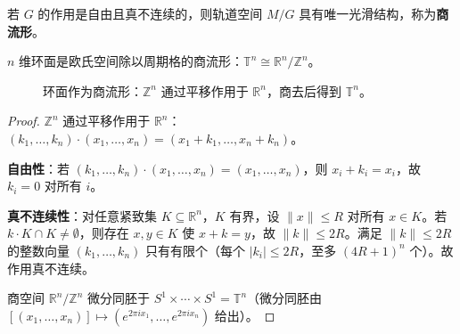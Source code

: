 \begin{definition}[轨道与商流形]\label{def:quotient_manifold}
若 $G$ 的作用是自由且真不连续的，则轨道空间 $M/G$ 具有唯一光滑结构，称为\textbf{商流形}。
\end{definition}

\begin{proposition}[环面作为商流形]\label{prop:torus_quotient}
$n$ 维环面是欧氏空间除以周期格的商流形：$\mathbb{T}^n \cong \mathbb{R}^n / \mathbb{Z}^n$。
\end{proposition}

\begin{figure}[htbp]
\centering
{}
\caption{环面作为商流形：$\mathbb{Z}^n$ 通过平移作用于 $\mathbb{R}^n$，商去后得到 $\mathbb{T}^n$。}
\label{fig:torus_quotient}
\end{figure}

\begin{proof}
$\mathbb{Z}^n$ 通过平移作用于 $\mathbb{R}^n$：$(k_1, \dots, k_n) \cdot (x_1, \dots, x_n) = (x_1 + k_1, \dots, x_n + k_n)$。

\textbf{自由性}：若 $(k_1,\dots,k_n)\cdot(x_1,\dots,x_n) = (x_1,\dots,x_n)$，则 $x_i + k_i = x_i$，故 $k_i = 0$ 对所有 $i$。

\textbf{真不连续性}：对任意紧致集 $K \subseteq \mathbb{R}^n$，$K$ 有界，设 $\|x\| \le R$ 对所有 $x \in K$。若 $k \cdot K \cap K \neq \emptyset$，则存在 $x, y \in K$ 使 $x + k = y$，故 $\|k\| \le 2R$。满足 $\|k\| \le 2R$ 的整数向量 $(k_1, \dots, k_n)$ 只有有限个（每个 $|k_i| \le 2R$，至多 $(4R+1)^n$ 个）。故作用真不连续。

商空间 $\mathbb{R}^n/\mathbb{Z}^n$ 微分同胚于 $S^1 \times \cdots \times S^1 = \mathbb{T}^n$（微分同胚由 $[(x_1, \dots, x_n)] \mapsto (e^{2\pi i x_1}, \dots, e^{2\pi i x_n})$ 给出）。
\end{proof}

